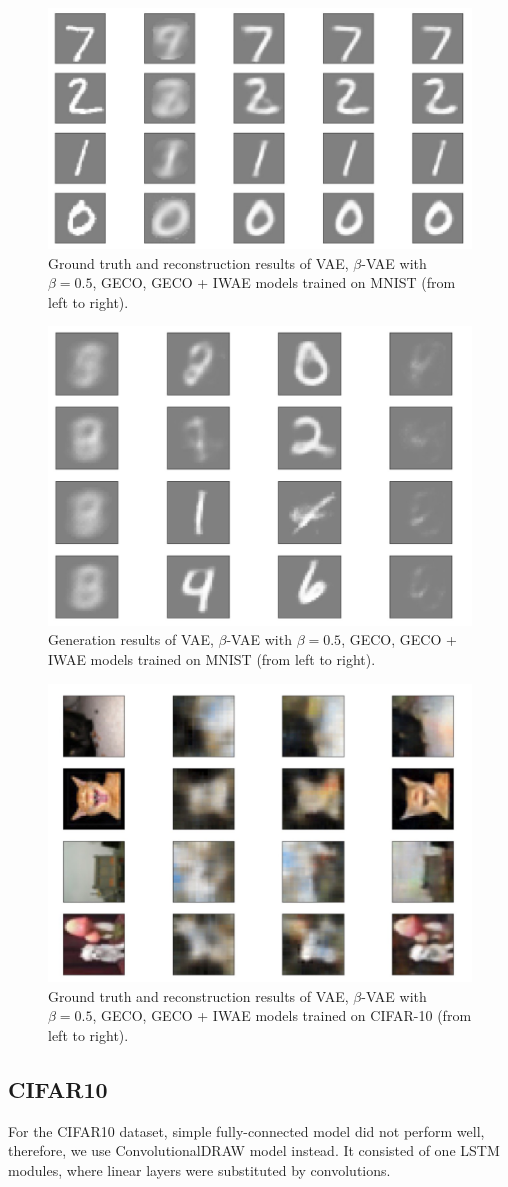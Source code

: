 \documentclass{article}
\begin{document}
\begin{figure}
\centering
  \includegraphics[width=0.5\linewidth]{pics/mnist_rec.png}
\caption{\label{fig:mnist_rec}Ground truth and reconstruction results of VAE, $\beta$-VAE with $\beta=0.5$, GECO, GECO + IWAE models trained on MNIST (from left to right).}
\end{figure}

\begin{figure}[!h]
\centering
  \includegraphics[width=0.5\linewidth]{pics/mnist_gen.png}
\caption{\label{fig:mnist_gen}Generation results of VAE, $\beta$-VAE with $\beta=0.5$, GECO, GECO + IWAE models trained on MNIST (from left to right).}
\end{figure}

\begin{figure}[!h]
\centering
  \includegraphics[width=0.5\linewidth]{pics/cifar10_rec.png}
\caption{\label{fig:cifar10_rec}Ground truth and reconstruction results of VAE, $\beta$-VAE with $\beta=0.5$, GECO, GECO + IWAE models trained on CIFAR-10 (from left to right).}
\end{figure}

\subsection{CIFAR10}
For the CIFAR10 dataset, simple fully-connected model did not perform well, therefore, we use ConvolutionalDRAW model instead. It consisted of one LSTM modules, where linear layers were substituted by convolutions. 
\end{document}
